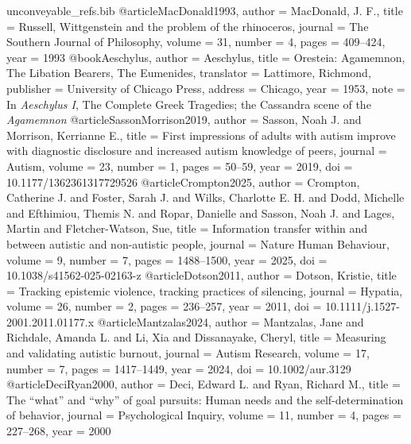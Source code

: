 \begin{filecontents}[overwrite]{unconveyable_refs.bib}
@article{MacDonald1993,
  author = {MacDonald, J. F.},
  title = {Russell, {Wittgenstein} and the problem of the rhinoceros},
  journal = {The Southern Journal of Philosophy}, volume = {31}, number = {4}, pages = {409--424}, year = {1993}}
@book{Aeschylus,
  author = {Aeschylus},
  title = {Oresteia: Agamemnon, The Libation Bearers, The Eumenides},
  translator = {Lattimore, Richmond},
  publisher = {University of Chicago Press}, address = {Chicago}, year = {1953},
  note = {In \emph{Aeschylus I}, The Complete Greek Tragedies; the Cassandra scene of the \emph{Agamemnon}}}
@article{SassonMorrison2019,
  author = {Sasson, Noah J. and Morrison, Kerrianne E.},
  title = {First impressions of adults with autism improve with diagnostic disclosure and increased autism knowledge of peers},
  journal = {Autism}, volume = {23}, number = {1}, pages = {50--59}, year = {2019},
  doi = {10.1177/1362361317729526}}
@article{Crompton2025,
  author = {Crompton, Catherine J. and Foster, Sarah J. and Wilks, Charlotte E. H. and Dodd, Michelle and Efthimiou, Themis N. and Ropar, Danielle and Sasson, Noah J. and Lages, Martin and Fletcher-Watson, Sue},
  title = {Information transfer within and between autistic and non-autistic people},
  journal = {Nature Human Behaviour}, volume = {9}, number = {7}, pages = {1488--1500}, year = {2025},
  doi = {10.1038/s41562-025-02163-z}}
@article{Dotson2011,
  author = {Dotson, Kristie},
  title = {Tracking epistemic violence, tracking practices of silencing},
  journal = {Hypatia}, volume = {26}, number = {2}, pages = {236--257}, year = {2011},
  doi = {10.1111/j.1527-2001.2011.01177.x}}
@article{Mantzalas2024,
  author = {Mantzalas, Jane and Richdale, Amanda L. and Li, Xia and Dissanayake, Cheryl},
  title = {Measuring and validating autistic burnout},
  journal = {Autism Research}, volume = {17}, number = {7}, pages = {1417--1449}, year = {2024},
  doi = {10.1002/aur.3129}}
@article{DeciRyan2000,
  author = {Deci, Edward L. and Ryan, Richard M.},
  title = {The ``what'' and ``why'' of goal pursuits: Human needs and the self-determination of behavior},
  journal = {Psychological Inquiry}, volume = {11}, number = {4}, pages = {227--268}, year = {2000}}

\end{filecontents}

